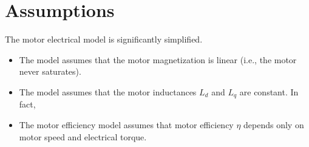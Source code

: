 \documentclass[../SimBALink.tex]{subfiles}
\begin{document}
\section{Assumptions}
	The motor electrical model is significantly simplified.
	\begin{itemize}
		\item 
			The model assumes that the motor magnetization is linear (i.e., the motor never saturates).
		\item
			The model assumes that the motor inductances $L_d$ and $L_q$ are constant. In fact, 
		\item
			The motor efficiency model assumes that motor efficiency $\eta$ depends only on motor speed and electrical torque.
	\end{itemize}



\end{document}
